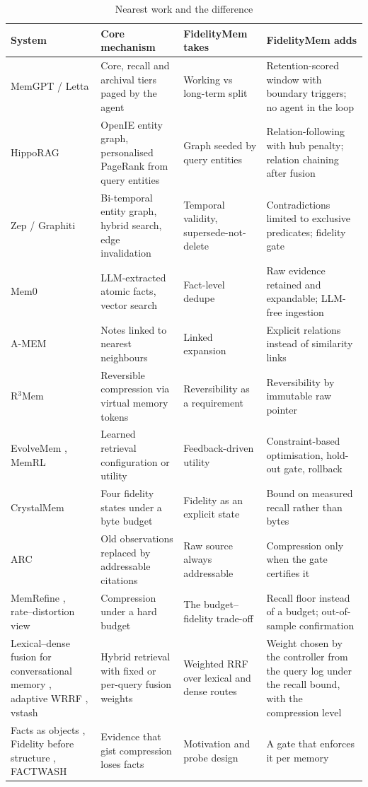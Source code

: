 \documentclass[conference]{IEEEtran}
\begin{document}
\begin{table}[t]
\caption{Nearest work and the difference}
\label{tab:related}
\centering
\footnotesize
\begin{tabular}{p{3.1cm}p{4.2cm}p{3.6cm}p{5.6cm}}
\toprule
System & Core mechanism & FidelityMem takes & FidelityMem adds \\
\midrule
MemGPT / Letta \cite{memgpt} & Core, recall and archival tiers paged by the agent & Working vs long-term split & Retention-scored window with boundary triggers; no agent in the loop \\
HippoRAG \cite{hipporag} & OpenIE entity graph, personalised PageRank from query entities & Graph seeded by query entities & Relation-following with hub penalty; relation chaining after fusion \\
Zep / Graphiti \cite{zep} & Bi-temporal entity graph, hybrid search, edge invalidation & Temporal validity, supersede-not-delete & Contradictions limited to exclusive predicates; fidelity gate \\
Mem0 \cite{mem0} & LLM-extracted atomic facts, vector search & Fact-level dedupe & Raw evidence retained and expandable; LLM-free ingestion \\
A-MEM \cite{amem} & Notes linked to nearest neighbours & Linked expansion & Explicit relations instead of similarity links \\
R$^3$Mem \cite{r3mem} & Reversible compression via virtual memory tokens & Reversibility as a requirement & Reversibility by immutable raw pointer \\
EvolveMem \cite{evolvemem}, MemRL \cite{memrl} & Learned retrieval configuration or utility & Feedback-driven utility & Constraint-based optimisation, hold-out gate, rollback \\
CrystalMem \cite{crystalmem} & Four fidelity states under a byte budget & Fidelity as an explicit state & Bound on measured recall rather than bytes \\
ARC \cite{arc} & Old observations replaced by addressable citations & Raw source always addressable & Compression only when the gate certifies it \\
MemRefine \cite{memrefine}, rate--distortion view \cite{ratedist} & Compression under a hard budget & The budget--fidelity trade-off & Recall floor instead of a budget; out-of-sample confirmation \\
Lexical--dense fusion for conversational memory \cite{tfusion}, adaptive WRRF \cite{wrrf}, vstash \cite{vstash} & Hybrid retrieval with fixed or per-query fusion weights & Weighted RRF over lexical and dense routes & Weight chosen by the controller from the query log under the recall bound, with the compression level \\
Facts as objects \cite{facts}, Fidelity before structure \cite{fidelity}, FACTWASH \cite{factwash} & Evidence that gist compression loses facts & Motivation and probe design & A gate that enforces it per memory \\
\bottomrule
\end{tabular}
\end{table}
\end{document}

